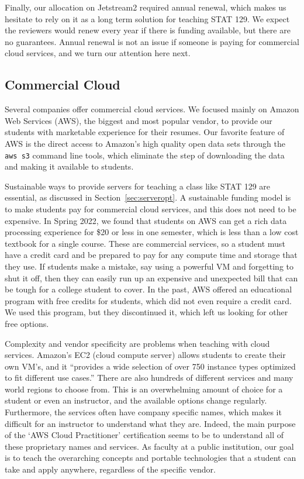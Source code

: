 \documentclass[12pt]{article}
\begin{document}
Finally, our allocation on Jetstream2 required annual renewal, which makes us hesitate to rely on it as a long term solution for teaching STAT 129.
We expect the reviewers would renew every year if there is funding available, but there are no guarantees.
Annual renewal is not an issue if someone is paying for commercial cloud services, and we turn our attention here next.


\subsection{Commercial Cloud}
\label{sec:comcloud}

Several companies offer commercial cloud services.
We focused mainly on Amazon Web Services (AWS), the biggest and most popular vendor, to provide our students with marketable experience for their resumes.
Our favorite feature of AWS is the direct access to Amazon's high quality open data sets through the \texttt{aws s3} command line tools, which eliminate the step of downloading the data and making it available to students.

Sustainable ways to provide servers for teaching a class like STAT 129 are essential, as discussed in Section~\ref{sec:serveropt}.
A sustainable funding model is to make students pay for commercial cloud services, and this does not need to be expensive.
In Spring 2022, we found that students on AWS can get a rich data processing experience for \$20 or less in one semester, which is less than a low cost textbook for a single course.
These are commercial services, so a student must have a credit card and be prepared to pay for any compute time and storage that they use.
If students make a mistake, say using a powerful VM and forgetting to shut it off, then they can easily run up an expensive and unexpected bill that can be tough for a college student to cover.
In the past, AWS offered an educational program with free credits for students, which did not even require a credit card.
We used this program, but they discontinued it, which left us looking for other free options.

Complexity and vendor specificity are problems when teaching with cloud services.
Amazon's EC2 (cloud compute server) allows students to create their own VM's, and it ``provides a wide selection of over 750 instance types optimized to fit different use cases.''\cite{aws-ec2}
There are also hundreds of different services and many world regions to choose from.
This is an overwhelming amount of choice for a student or even an instructor, and the available options change regularly.
Furthermore, the services often have company specific names, which makes it difficult for an instructor to understand what they are.
Indeed, the main purpose of the `AWS Cloud Practitioner' certification seems to be to understand all of these proprietary names and services.
As faculty at a public institution, our goal is to teach the overarching concepts and portable technologies that a student can take and apply anywhere, regardless of the specific vendor.
\end{document}
